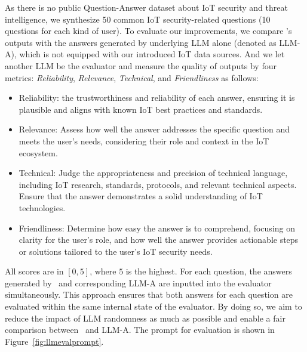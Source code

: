 As there is no public Question-Answer dataset about IoT security and threat intelligence, we synthesize 50 common IoT security-related questions (10 questions for each kind of user).
To evaluate our improvements, we compare \chatiot's outputs with the answers generated by underlying LLM alone (denoted as LLM-A), which is not equipped with our introduced IoT data sources. 
And we let another LLM be the evaluator and measure the quality of outputs by four metrics: \textit{Reliability}, \textit{Relevance}, \textit{Technical}, and \textit{Friendliness} as follows:
\begin{itemize}
    \item Reliability: the trustworthiness and reliability of each answer, ensuring it is plausible and aligns with known IoT best practices and standards.
    \item Relevance: Assess how well the answer addresses the specific question and meets the user’s needs, considering their role and context in the IoT ecosystem.
    \item Technical: Judge the appropriateness and precision of technical language, including IoT research, standards, protocols, and relevant technical aspects. Ensure that the answer demonstrates a solid understanding of IoT technologies.
    \item Friendliness: Determine how easy the answer is to comprehend, focusing on clarity for the user’s role, and how well the answer provides actionable steps or solutions tailored to the user’s IoT security needs. 
\end{itemize}
All scores are in $[0,5]$, where $5$ is the highest. 
For each question, the answers generated by \chatiot\ and corresponding LLM-A are inputted into the evaluator simultaneously. 
This approach ensures that both answers for each question are evaluated within the same internal state of the evaluator. By doing so, we aim to reduce the impact of LLM randomness as much as possible and enable a fair comparison between \chatiot\ and LLM-A.
The prompt for evaluation is shown in Figure~\ref{fig:llmevalprompt}.





